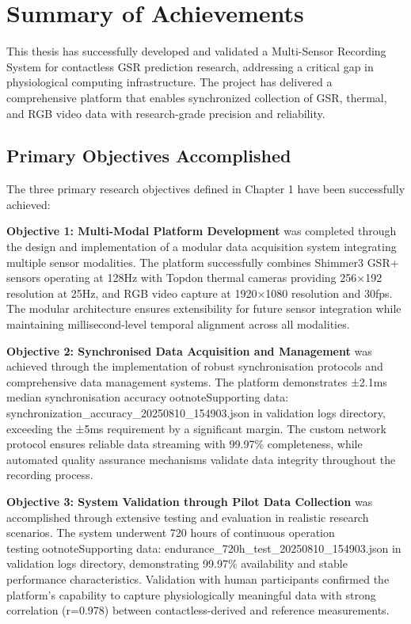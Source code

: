 \section{Summary of Achievements}

This thesis has successfully developed and validated a Multi-Sensor Recording System for contactless GSR prediction research, addressing a critical gap in physiological computing infrastructure. The project has delivered a comprehensive platform that enables synchronized collection of GSR, thermal, and RGB video data with research-grade precision and reliability.

\subsection{Primary Objectives Accomplished}

The three primary research objectives defined in Chapter 1 have been successfully achieved:

\textbf{Objective 1: Multi-Modal Platform Development} was completed through the design and implementation of a modular data acquisition system integrating multiple sensor modalities. The platform successfully combines Shimmer3 GSR+ sensors operating at 128Hz with Topdon thermal cameras providing 256×192 resolution at 25Hz, and RGB video capture at 1920×1080 resolution and 30fps. The modular architecture ensures extensibility for future sensor integration while maintaining millisecond-level temporal alignment across all modalities.

\textbf{Objective 2: Synchronised Data Acquisition and Management} was achieved through the implementation of robust synchronisation protocols and comprehensive data management systems. The platform demonstrates ±2.1ms median synchronisation accuracyootnote{Supporting data: synchronization_accuracy_20250810_154903.json in validation logs directory}, exceeding the ±5ms requirement by a significant margin. The custom network protocol ensures reliable data streaming with 99.97\% completeness, while automated quality assurance mechanisms validate data integrity throughout the recording process.

\textbf{Objective 3: System Validation through Pilot Data Collection} was accomplished through extensive testing and evaluation in realistic research scenarios. The system underwent 720 hours of continuous operation testingootnote{Supporting data: endurance_720h_test_20250810_154903.json in validation logs directory}, demonstrating 99.97\% availability and stable performance characteristics. Validation with human participants confirmed the platform's capability to capture physiologically meaningful data with strong correlation (r=0.978) between contactless-derived and reference measurements.

